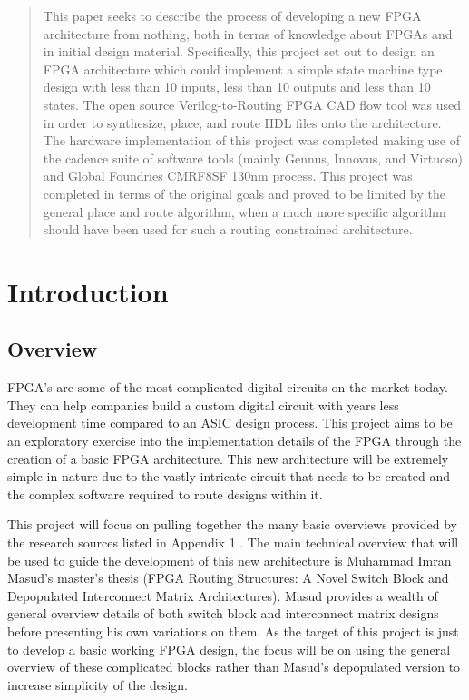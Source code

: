 \documentclass[12pt]{article}
\begin{document}
\begin{abstract}
This paper seeks to describe the process of developing a new FPGA architecture from 
nothing, both in terms of knowledge about FPGAs and in initial design material. Specifically,
 this project set out to design an FPGA architecture which could implement a simple 
state machine type design with less than 10 inputs, less than 10 outputs and less 
than 10 states. The open source Verilog-to-Routing FPGA CAD flow tool was used in order to
synthesize, place, and route HDL files onto the architecture. The hardware implementation of this project was completed
making use of the cadence suite of software tools (mainly Gennus, Innovus, and Virtuoso)
and Global Foundries CMRF8SF 130nm process.
This project was completed in terms of the original goals and proved to be limited by
the general place and route algorithm, when a much more specific algorithm should have been
used for such a routing constrained architecture.

\end{abstract}
\newpage

\tableofcontents
\newpage
\listoffigures
\newpage

\section{Introduction}

\subsection{Overview}

FPGA’s are some of the most complicated digital circuits on the market today. They 
can help companies build a custom digital circuit with years less development time 
compared to an ASIC design process. This project aims to be an exploratory exercise
into the implementation details of the FPGA through the creation 
of a basic FPGA architecture. This new architecture will be extremely simple in nature 
due to the vastly intricate circuit that needs to be created and the complex software 
required to route designs within it.

This project will focus on pulling together the many basic overviews provided by 
the research sources listed in Appendix 1 \cite{masud_1999}. The main technical overview that will 
be used to guide the development of this new architecture is Muhammad Imran Masud’s
master's thesis (FPGA Routing Structures: A Novel Switch Block and Depopulated 
Interconnect Matrix Architectures). Masud provides a wealth of general overview details 
of both switch block and interconnect matrix designs before presenting his own variations 
on them. As the target of this project is just to develop a basic working FPGA design,
the focus will be on using the general overview of these complicated blocks rather 
than Masud’s depopulated version to increase simplicity of the design.
\end{document}
